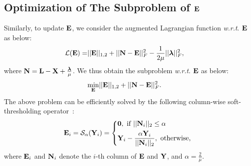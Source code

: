 \documentclass[letterpaper]{article}
\def\bN{{\bf N}}
\def\bE{{\bf E}}
\def\blambda{{\bm \lambda}}
\def\calL{{\mathcal{L}}}
\def\calS{{\mathcal{S}}}
\def\bL{{\bf L}}
\def\bX{{\bf X}}
\def\bX{{\bf X}}
\def\bY{{\bf Y}}
\def\zerocolumn{{\bf 0}}
\def\wrt{\emph{w.r.t}}
\begin{document}
\subsection{Optimization of The Subproblem of $\bE$}

Similarly, to update $\bE$, we consider the augmented Lagrangian function \wrt. $\bE$ as below:
\begin{align}\label{eq:subproblem_wrt_E_1}
  \calL (\bE) = & || \bE ||_{1,2} + || \bN - \bE ||_F^2 - \frac{1}{2\mu}|| \blambda ||_F^2   ,
\end{align}
\noindent
where $\bN = \bL - \bX + \frac{\blambda}{\mu}$.
We thus obtain the subproblem \wrt. $\bE$ as below:
\begin{align}\label{eq:subproblem_wrt_E_2}
  \min_{\bE} & || \bE ||_{1,2} + || \bN - \bE ||_F^2 .
\end{align}
\noindent
The above problem can be efficiently solved by the following column-wise soft-thresholding operator~\cite{xiao2015FaLRR}:
\begin{align}\label{eq:column_wise_soft_thresholding}
  \bE_{i} = \calS_{\alpha}(\bY_{i}) = \left\{
    \begin{aligned}
      & \zerocolumn,~\text{if}~ ||\bN_{i}||_2 \leq \alpha   \\
      & \bY_{i} - \frac{\alpha \bY_{i}}{|| \bN_{i} ||_2},~\text{otherwise,}
    \end{aligned}
    \right.
\end{align}
\noindent
where $\bE_{i}$ and $\bN_{i}$ denote the $i$-th column of $\bE$ and $\bY$,
and $\alpha = \frac{2}{\mu}$.
\end{document}
